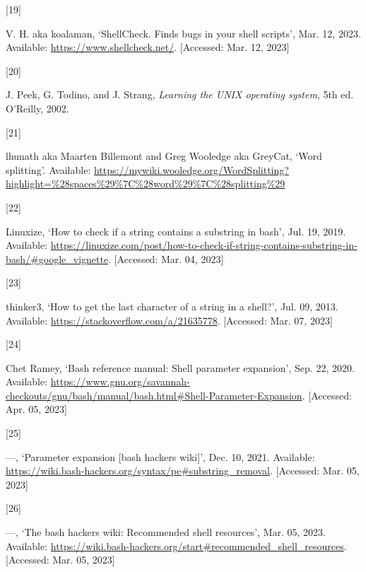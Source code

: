 \documentclass[
  a4paper,
]{article}
\newlength{\cslhangindent}
\newlength{\csllabelwidth}
\newlength{\cslentryspacingunit} %
\newenvironment{CSLReferences}[2] %
 {%
  \setlength{\parindent}{0pt}
  \ifodd #1
  \let\oldpar\par
  \def\par{\hangindent=\cslhangindent\oldpar}
  \fi
  \setlength{\parskip}{#2\cslentryspacingunit}
 }%
 {}
\newcommand{\CSLLeftMargin}[1]{\parbox[t]{\csllabelwidth}{#1}}
\newcommand{\CSLRightInline}[1]{\parbox[t]{\linewidth - \csllabelwidth}{#1}\break}
\begin{document}
\begin{CSLReferences}{0}{0}
\leavevmode{}%
\CSLLeftMargin{{[}19{]} }%
\CSLRightInline{V. H. aka koalaman, {`ShellCheck. Finds bugs in your
shell scripts'}, Mar. 12, 2023. Available:
\url{https://www.shellcheck.net/}. {[}Accessed: Mar. 12, 2023{]}}

\leavevmode{}%
\CSLLeftMargin{{[}20{]} }%
\CSLRightInline{J. Peek, G. Todino, and J. Strang, \emph{Learning the
UNIX operating system}, 5th ed. O'Reilly, 2002.}

\leavevmode{}%
\CSLLeftMargin{{[}21{]} }%
\CSLRightInline{lhunath aka Maarten Billemont and Greg Wooledge aka
GreyCat, {`Word splitting'}. Available:
\url{https://mywiki.wooledge.org/WordSplitting?highlight=\%28spaces\%29\%7C\%28word\%29\%7C\%28splitting\%29}}

\leavevmode{}%
\CSLLeftMargin{{[}22{]} }%
\CSLRightInline{Linuxize, {`How to check if a string contains a
substring in bash'}, Jul. 19, 2019. Available:
\url{https://linuxize.com/post/how-to-check-if-string-contains-substring-in-bash/\#google_vignette}.
{[}Accessed: Mar. 04, 2023{]}}

\leavevmode{}%
\CSLLeftMargin{{[}23{]} }%
\CSLRightInline{thinker3, {`How to get the last character of a string in
a shell?'}, Jul. 09, 2013. Available:
\url{https://stackoverflow.com/a/21635778}. {[}Accessed: Mar. 07,
2023{]}}

\leavevmode{}%
\CSLLeftMargin{{[}24{]} }%
\CSLRightInline{Chet Ramey, {`Bash reference manual: Shell parameter
expansion'}, Sep. 22, 2020. Available:
\url{https://www.gnu.org/savannah-checkouts/gnu/bash/manual/bash.html\#Shell-Parameter-Expansion}.
{[}Accessed: Apr. 05, 2023{]}}

\leavevmode{}%
\CSLLeftMargin{{[}25{]} }%
\CSLRightInline{---, {`Parameter expansion {[}bash hackers wiki{]}'},
Dec. 10, 2021. Available:
\url{https://wiki.bash-hackers.org/syntax/pe\#substring_removal}.
{[}Accessed: Mar. 05, 2023{]}}

\leavevmode{}%
\CSLLeftMargin{{[}26{]} }%
\CSLRightInline{---, {`The bash hackers wiki: Recommended shell
resources'}, Mar. 05, 2023. Available:
\url{https://wiki.bash-hackers.org/start\#recommended_shell_resources}.
{[}Accessed: Mar. 05, 2023{]}}

\end{CSLReferences}
\end{document}
